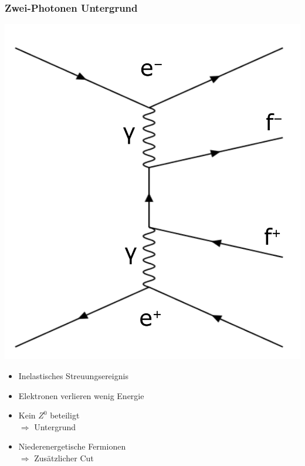 \begin{frame}
	\frametitle{Zwei-Photonen Untergrund}
	\begin{minipage}{0.48\linewidth}
		\centering
		\includegraphics[width=1.0\linewidth]{graphics/twophotonfeynman}
	\end{minipage}
	\begin{minipage}{0.48\linewidth}
		\begin{center}
			\begin{itemize}
				\item Inelastisches Streuungsereignis\\\hfill
				\item Elektronen verlieren wenig Energie\\\hfill
				\item Kein $Z^0$ beteiligt \\$\Rightarrow$ Untergrund\\\hfill
				\item Niederenergetische Fermionen\\ $\Rightarrow$ Zusätzlicher Cut
			\end{itemize}
		\end{center}
	\end{minipage}
\end{frame}


